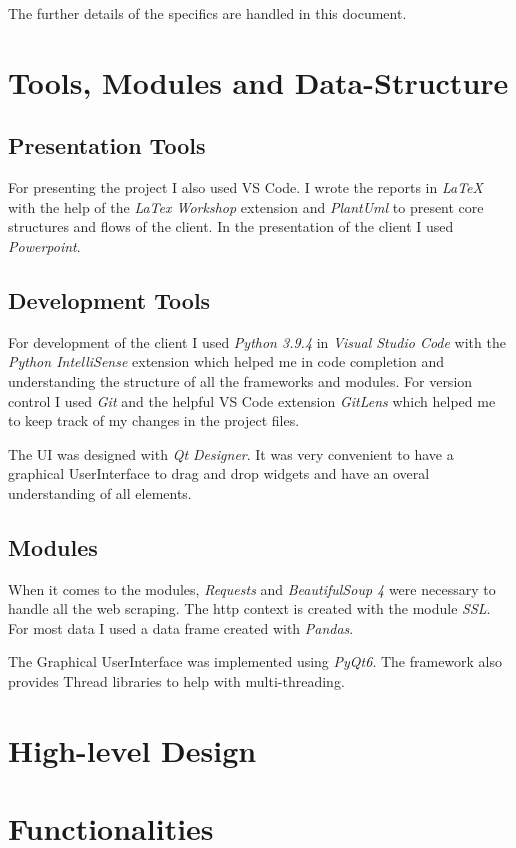 \documentclass[12pt]{article}
\begin{document}
The further details of the specifics are handled in this document.

\section{Tools, Modules and Data-Structure}
\subsection{Presentation Tools}
For presenting the project I also used VS Code. I wrote the reports in \textit{\LaTeX} with the help of the \textit{LaTex Workshop} extension and 
\textit{PlantUml} to present core structures and flows of the client.
In the presentation of the client I used \textit{Powerpoint}. 

\subsection{Development Tools}
For development of the client I used \textit{Python 3.9.4} in \textit{Visual Studio 
Code} with the \textit{Python IntelliSense} extension which helped me in code 
completion and understanding the structure of all the frameworks and modules. For 
version control I used \textit{Git} and the helpful VS Code extension 
\textit{GitLens} which helped me to keep track of my changes in the project files.

The UI was designed with \textit{Qt Designer}. It was very convenient to
have a graphical UserInterface to drag and drop widgets and have an overal 
understanding of all elements.

\subsection{Modules}
When it comes to the modules, \textit{Requests} and \textit{BeautifulSoup 4} were  
necessary to handle all the web scraping. The http context is created with the 
module \textit{SSL}. For most data I used a data frame created with \textit{Pandas}.

The Graphical UserInterface was implemented using \textit{PyQt6}. The framework also
provides Thread libraries to help with multi-threading.

\section{High-level Design}

\section{Functionalities}
\end{document}
